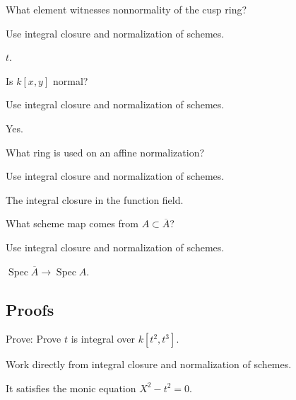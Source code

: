 \begin{exercise}[Witness]\label{exr:vi28-expand-02}
What element witnesses nonnormality of the cusp ring?
\end{exercise}
\begin{hint}
Use integral closure and normalization of schemes.
\end{hint}
\begin{solution}
$t$.
\end{solution}

\begin{exercise}[Polynomial]\label{exr:vi28-expand-03}
Is $k[x,y]$ normal?
\end{exercise}
\begin{hint}
Use integral closure and normalization of schemes.
\end{hint}
\begin{solution}
Yes.
\end{solution}

\begin{exercise}[Definition]\label{exr:vi28-expand-04}
What ring is used on an affine normalization?
\end{exercise}
\begin{hint}
Use integral closure and normalization of schemes.
\end{hint}
\begin{solution}
The integral closure in the function field.
\end{solution}

\begin{exercise}\label{exr:vi28-expand-05}
What scheme map comes from $A\subset\overline A$?
\end{exercise}
\begin{hint}
Use integral closure and normalization of schemes.
\end{hint}
\begin{solution}
$\operatorname{Spec}\overline A\to\operatorname{Spec}A$.
\end{solution}

\subsection*{Proofs}

\begin{exercise}\label{exr:vi28-expand-06}
Prove: Prove $t$ is integral over $k[t^2,t^3]$.
\end{exercise}
\begin{hint}
Work directly from integral closure and normalization of schemes.
\end{hint}
\begin{solution}
It satisfies the monic equation $X^2-t^2=0$.
\end{solution}

